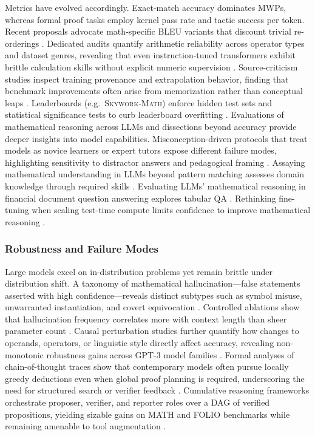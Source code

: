 \documentclass[acmsmall,anonymous]{acmart}
\begin{document}
Metrics have evolved accordingly.  Exact‐match accuracy dominates MWPs, whereas formal proof tasks employ kernel pass rate and tactic success per token.  Recent proposals advocate math‐specific BLEU variants that discount trivial re-orderings \cite{li2024benchmarkingllmmath}. Dedicated audits quantify arithmetic reliability across operator types and dataset genres, revealing that even instruction-tuned transformers exhibit brittle calculation skills without explicit numeric supervision \cite{yuan-2023-arithmetic-eval}.  Source-criticism studies inspect training provenance and extrapolation behavior, finding that benchmark improvements often arise from memorization rather than conceptual leaps \cite{yousefzadeh-2023-source-criticism}.  Leaderboards (e.g.\ \textsc{Skywork‐Math}) enforce hidden test sets and statistical significance tests to curb leaderboard overfitting \cite{zeng2024skywork}. Evaluations of mathematical reasoning across LLMs \cite{anonymous2025evaluatingmathreasoning,anonymous2025evaluationmathsolving,anonymous2025evaluationmathsolving,anonymous2025evaluatingmathreasoning} and dissections beyond accuracy \cite{anonymous2025beyondaccuracy,anonymous2025beyondaccuracy} provide deeper insights into model capabilities. Misconception-driven protocols that treat models as novice learners or expert tutors expose different failure modes, highlighting sensitivity to distractor answers and pedagogical framing \cite{liu-2023-novice-expert}. Assaying mathematical understanding in LLMs beyond pattern matching assesses domain knowledge through required skills \cite{guo2024learning}. Evaluating LLMs' mathematical reasoning in financial document question answering explores tabular QA \cite{srivastava2024evaluating}. Rethinking fine-tuning when scaling test-time compute limits confidence to improve mathematical reasoning \cite{chen2025a}.

\subsubsection{Robustness and Failure Modes}\label{sec:robust}
Large models excel on in‐distribution problems yet remain brittle under distribution shift.  A taxonomy of mathematical hallucination—false statements asserted with high confidence—reveals distinct subtypes such as symbol misuse, unwarranted instantiation, and covert equivocation \cite{sun2024benchmarking}.  Controlled ablations show that hallucination frequency correlates more with context length than sheer parameter count \cite{yang2023steamroller}.  Causal perturbation studies further quantify how changes to operands, operators, or linguistic style directly affect accuracy, revealing non-monotonic robustness gains across GPT-3 model families \cite{stolfo-2023-causal}.  Formal analyses of chain-of-thought traces show that contemporary models often pursue locally greedy deductions even when global proof planning is required, underscoring the need for structured search or verifier feedback \cite{saparov-2023-greedy}.  Cumulative reasoning frameworks orchestrate proposer, verifier, and reporter roles over a DAG of verified propositions, yielding sizable gains on MATH and FOLIO benchmarks while remaining amenable to tool augmentation \cite{zhang-2025-cumulative-reasoning}.  
\end{document}
